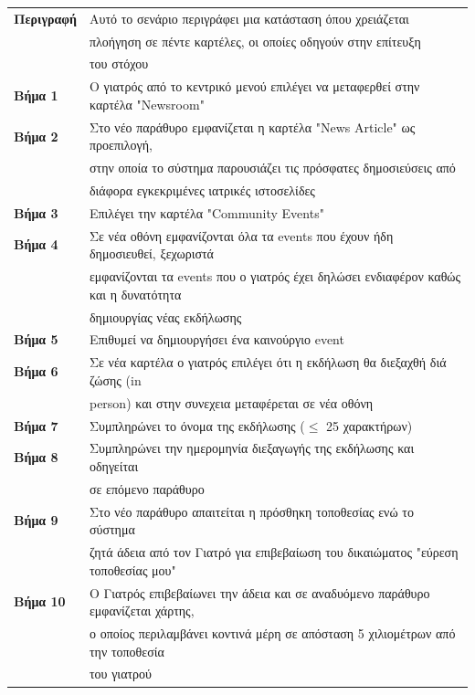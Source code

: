 \documentclass{article}
\newcommand\T{\rule{0pt}{2.6ex}}       %
\newcommand\B{\rule[-1.2ex]{0pt}{0pt}}
\begin{document}
 \begin{center}
     \begin{tabular}{|l|l|}
     \hline
      \textbf{Περιγραφή} & Αυτό το σενάριο περιγράφει μια κατάσταση όπου χρειάζεται \T \\& πλοήγηση σε πέντε καρτέλες, οι οποίες οδηγούν στην επίτευξη \\& του στόχου \B \\ 
      \hline
      \textbf{Βήμα 1} & Ο γιατρός από το κεντρικό μενού επιλέγει να μεταφερθεί στην καρτέλα "Newsroom" \T\B \\
      \hline
      \textbf{Βήμα 2} & Στο νέο παράθυρο εμφανίζεται η καρτέλα "News Article" ως προεπιλογή, \T \\& στην οποία το σύστημα παρουσιάζει τις πρόσφατες δημοσιεύσεις από \\& διάφορα εγκεκριμένες ιατρικές ιστοσελίδες \B \\
      \hline
      \textbf{Βήμα 3} & Επιλέγει την καρτέλα "Community Events" \T\B \\
      \hline
      \textbf{Βήμα 4} & Σε νέα οθόνη εμφανίζονται όλα τα events που έχουν ήδη δημοσιευθεί, ξεχωριστά\T \\ & εμφανίζονται τα events που ο γιατρός έχει δηλώσει ενδιαφέρον καθώς  και η δυνατότητα \\& δημιουργίας νέας εκδήλωσης\B \\
      \hline
      \textbf{Βήμα 5} & Επιθυμεί να δημιουργήσει ένα καινούργιο event \T\B \\
      \hline
      \textbf{Βήμα 6} & Σε νέα καρτέλα ο γιατρός επιλέγει ότι η εκδήλωση θα διεξαχθή διά ζώσης (in \T \\& person) και στην συνεχεια μεταφέρεται σε νέα οθόνη \B\\
      \hline
      \textbf{Βήμα 7} & Συμπληρώνει το όνομα της εκδήλωσης ($\le$ 25 χαρακτήρων) \T\B \\
      \hline
      \textbf{Βήμα 8} & Συμπληρώνει την ημερομηνία διεξαγωγής της εκδήλωσης και οδηγείται \T \\& σε επόμενο παράθυρο \B \\
      \hline
      \textbf{Βήμα 9} & Στο νέο παράθυρο απαιτείται η πρόσθηκη τοποθεσίας ενώ το σύστημα \T \\& ζητά άδεια από τον Γιατρό για επιβεβαίωση του δικαιώματος "εύρεση τοποθεσίας μου" \B \\
      \hline
       \textbf{Βήμα 10} & Ο Γιατρός επιβεβαίωνει την άδεια και σε αναδυόμενο παράθυρο εμφανίζεται χάρτης, \T \\& ο οποίος περιλαμβάνει κοντινά μέρη σε απόσταση 5 χιλιομέτρων από την τοποθεσία \\& του γιατρού \B \\

\end{tabular}
\end{center}
\end{document}
